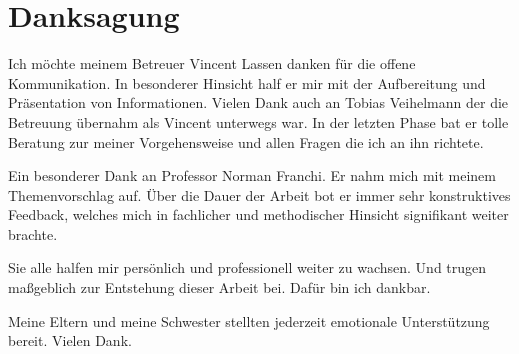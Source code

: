 \chapter{Danksagung}
%
Ich möchte meinem Betreuer Vincent Lassen danken für die offene Kommunikation.
In besonderer Hinsicht half er mir mit der Aufbereitung und Präsentation von Informationen.
Vielen Dank auch an Tobias Veihelmann der die Betreuung übernahm als Vincent unterwegs war.
In der letzten Phase bat er tolle Beratung zur meiner Vorgehensweise und allen Fragen die ich an ihn richtete.

Ein besonderer Dank an Professor Norman Franchi.
Er nahm mich mit meinem Themenvorschlag auf.
Über die Dauer der Arbeit bot er immer sehr konstruktives Feedback, welches mich in fachlicher und methodischer Hinsicht signifikant weiter brachte.

Sie alle halfen mir persönlich und professionell weiter zu wachsen.
Und trugen maßgeblich zur Entstehung dieser Arbeit bei.
Dafür bin ich dankbar.

Meine Eltern und meine Schwester stellten jederzeit emotionale Unterstützung bereit.
Vielen Dank.
